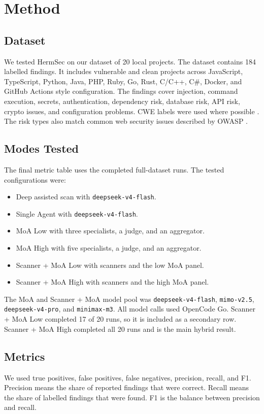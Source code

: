 \documentclass[sigconf,nonacm]{acmart}
\begin{document}
\section{Method}
\subsection{Dataset}
We tested HermSec on our dataset of 20 local projects. The dataset contains 184 labelled findings. It includes vulnerable and clean projects across JavaScript, TypeScript, Python, Java, PHP, Ruby, Go, Rust, C/C++, C\#, Docker, and GitHub Actions style configuration. The findings cover injection, command execution, secrets, authentication, dependency risk, database risk, API risk, crypto issues, and configuration problems. CWE labels were used where possible \cite{mitrecwe}. The risk types also match common web security issues described by OWASP \cite{owasptop10}.

\subsection{Modes Tested}
The final metric table uses the completed full-dataset runs. The tested configurations were:

\begin{itemize}
  \item Deep assisted scan with \texttt{deepseek-v4-flash}.
  \item Single Agent with \texttt{deepseek-v4-flash}.
  \item MoA Low with three specialists, a judge, and an aggregator.
  \item MoA High with five specialists, a judge, and an aggregator.
  \item Scanner + MoA Low with scanners and the low MoA panel.
  \item Scanner + MoA High with scanners and the high MoA panel.
\end{itemize}

The MoA and Scanner + MoA model pool was \texttt{deepseek-v4-flash}, \texttt{mimo-v2.5}, \texttt{deepseek-v4-pro}, and \texttt{minimax-m3}. All model calls used OpenCode Go. Scanner + MoA Low completed 17 of 20 runs, so it is included as a secondary row. Scanner + MoA High completed all 20 runs and is the main hybrid result.

\subsection{Metrics}
We used true positives, false positives, false negatives, precision, recall, and F1. Precision means the share of reported findings that were correct. Recall means the share of labelled findings that were found. F1 is the balance between precision and recall.
\end{document}
